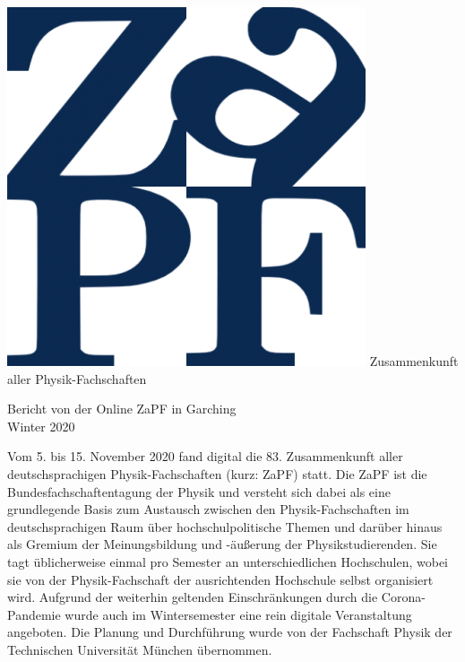 \documentclass{scrartcl}
\begin{document}
\hspace{0.74\textwidth}
\begin{minipage}{0.25\textwidth}
      \vspace{-1cm}
      \centering
      \includegraphics[width=.89\textwidth]{logo.png}
      \small Zusammenkunft aller Physik-Fachschaften
\end{minipage}

\begin{center}
      \vspace{1.5cm}
      \huge{Bericht von der Online ZaPF in Garching \\ Winter 2020}
      \vspace{1cm}
\end{center}

Vom 5. bis 15. November 2020 fand digital die 83. Zusammenkunft aller deutschsprachigen Physik-Fachschaften (kurz: ZaPF) statt. Die ZaPF ist die Bundesfachschaftentagung der Physik und versteht sich dabei als eine grundlegende Basis zum Austausch zwischen den Physik-Fachschaften im deutschsprachigen Raum über hochschulpolitische Themen und darüber hinaus als Gremium der Meinungsbildung und -äußerung der Physikstudierenden. Sie tagt üblicherweise einmal pro Semester an unterschiedlichen Hochschulen, wobei sie von der Physik-Fachschaft der ausrichtenden Hochschule selbst organisiert wird. Aufgrund der weiterhin geltenden Einschränkungen durch die Corona-Pandemie wurde auch im Wintersemester eine rein digitale Veranstaltung angeboten. Die Planung und Durchführung wurde von der Fachschaft Physik der Technischen Universität München übernommen.
\end{document}
